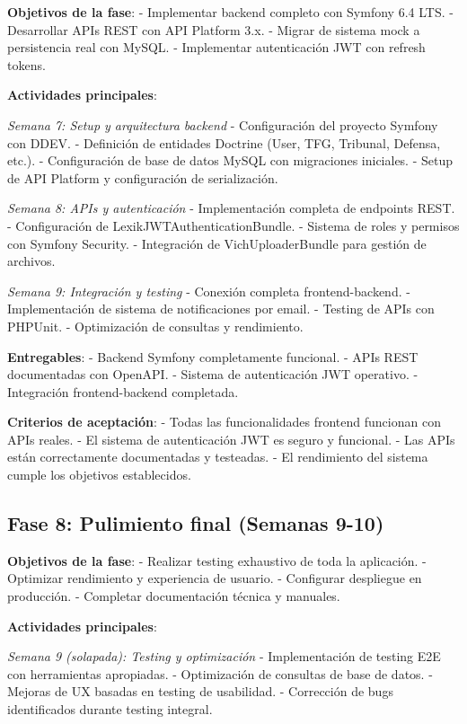\documentclass[12pt,a4paper,oneside]{report}
\begin{document}
\textbf{Objetivos de la fase}: - Implementar backend completo con
Symfony 6.4 LTS. - Desarrollar APIs REST con API Platform 3.x. - Migrar
de sistema mock a persistencia real con MySQL. - Implementar
autenticación JWT con refresh tokens.

\textbf{Actividades principales}:

\emph{Semana 7: Setup y arquitectura backend} - Configuración del
proyecto Symfony con DDEV. - Definición de entidades Doctrine (User,
TFG, Tribunal, Defensa, etc.). - Configuración de base de datos MySQL
con migraciones iniciales. - Setup de API Platform y configuración de
serialización.

\emph{Semana 8: APIs y autenticación} - Implementación completa de
endpoints REST. - Configuración de LexikJWTAuthenticationBundle. -
Sistema de roles y permisos con Symfony Security. - Integración de
VichUploaderBundle para gestión de archivos.

\emph{Semana 9: Integración y testing} - Conexión completa
frontend-backend. - Implementación de sistema de notificaciones por
email. - Testing de APIs con PHPUnit. - Optimización de consultas y
rendimiento.

\textbf{Entregables}: - Backend Symfony completamente funcional. - APIs
REST documentadas con OpenAPI. - Sistema de autenticación JWT operativo.
- Integración frontend-backend completada.

\textbf{Criterios de aceptación}: - Todas las funcionalidades frontend
funcionan con APIs reales. - El sistema de autenticación JWT es seguro y
funcional. - Las APIs están correctamente documentadas y testeadas. - El
rendimiento del sistema cumple los objetivos establecidos.

\subsection{Fase 8: Pulimiento final (Semanas
9-10)}\label{fase-8-pulimiento-final-semanas-9-10}

\textbf{Objetivos de la fase}: - Realizar testing exhaustivo de toda la
aplicación. - Optimizar rendimiento y experiencia de usuario. -
Configurar despliegue en producción. - Completar documentación técnica y
manuales.

\textbf{Actividades principales}:

\emph{Semana 9 (solapada): Testing y optimización} - Implementación de
testing E2E con herramientas apropiadas. - Optimización de consultas de
base de datos. - Mejoras de UX basadas en testing de usabilidad. -
Corrección de bugs identificados durante testing integral.
\end{document}

